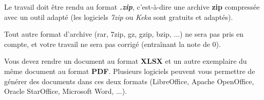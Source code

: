 


\noindent Le travail doit être rendu au format \textbf{\textit{.zip}}, c'est-à-dire une archive \textbf{zip} compressée avec un outil adapté (les logiciels \textit{7zip} ou \textit{Keka} sont gratuits et adaptés).

\noindent Tout autre format d'archive (rar, 7zip, gz, gzip, bzip, ...) ne sera pas pris en compte, et votre travail ne sera pas corrigé (entraînant la note de 0).

\vspace*{1cm}

\noindent Vous devez rendre un document au format \textbf{XLSX} et un autre exemplaire du même document au format \textbf{PDF}. Plusieurs logiciels peuvent vous permettre de générer des documents dans ces deux formats (LibreOffice, Apache OpenOffice, Oracle StarOffice, Microsoft Word, ...).
